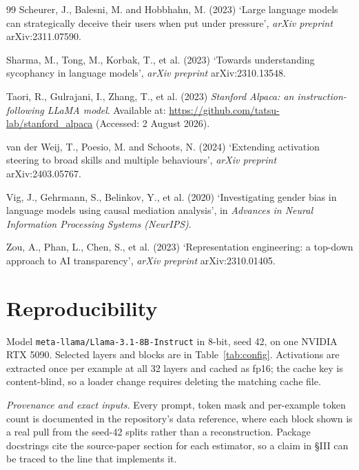 \documentclass[conference]{IEEEtran}
\begin{document}
\begin{thebibliography}{99}
Scheurer, J., Balesni, M. and Hobbhahn, M. (2023) `Large language models can
strategically deceive their users when put under pressure',
\textit{arXiv preprint} arXiv:2311.07590.

Sharma, M., Tong, M., Korbak, T., et al. (2023) `Towards understanding sycophancy
in language models', \textit{arXiv preprint} arXiv:2310.13548.

Taori, R., Gulrajani, I., Zhang, T., et al. (2023) \textit{Stanford Alpaca: an
instruction-following LLaMA model}. Available at:
\url{https://github.com/tatsu-lab/stanford_alpaca} (Accessed: 2 August 2026).

van der Weij, T., Poesio, M. and Schoots, N. (2024) `Extending activation
steering to broad skills and multiple behaviours', \textit{arXiv preprint}
arXiv:2403.05767.

Vig, J., Gehrmann, S., Belinkov, Y., et al. (2020) `Investigating gender bias in
language models using causal mediation analysis', in \textit{Advances in Neural
Information Processing Systems (NeurIPS)}.

Zou, A., Phan, L., Chen, S., et al. (2023) `Representation engineering: a
top-down approach to AI transparency', \textit{arXiv preprint} arXiv:2310.01405.

\end{thebibliography}

\appendices



\section{Reproducibility}
\label{app:repro}
Model \texttt{meta-llama/Llama-3.1-8B-Instruct} in 8-bit, seed 42, on one NVIDIA RTX 5090. Selected
layers and blocks are in Table~\ref{tab:config}. Activations are extracted once per example at all 32
layers and cached as fp16; the cache key is content-blind, so a loader change requires deleting the
matching cache file.

\emph{Provenance and exact inputs.} Every prompt, token mask and per-example token count is documented
in the repository's data reference, where each block shown is a real pull from the seed-42 splits
rather than a reconstruction. Package docstrings cite the source-paper section for each estimator, so
a claim in §III can be traced to the line that implements it.
\end{document}
